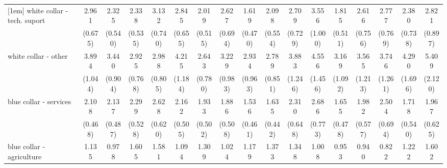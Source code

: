 {\begin{tabular}{l*{16}{c}}
[1em]
white collar - tech. suport&       2.961\sym{***}&       2.325\sym{***}&       2.338\sym{***}&       3.132\sym{***}&       2.845\sym{***}&       2.019\sym{**} &       2.627\sym{***}&       1.619         &       2.098\sym{**} &       2.709\sym{***}&       3.556\sym{***}&       1.815\sym{*}  &       2.616\sym{***}&       2.777\sym{***}&       2.380\sym{**} &       2.821\sym{**} \\
                    &     (0.675)         &     (0.540)         &     (0.535)         &     (0.740)         &     (0.655)         &     (0.515)         &     (0.694)         &     (0.470)         &     (0.554)         &     (0.729)         &     (1.000)         &     (0.511)         &     (0.756)         &     (0.769)         &     (0.738)         &     (0.897)         \\
[1em]
white collar - other&       3.894\sym{***}&       3.440\sym{***}&       2.925\sym{***}&       2.988\sym{***}&       4.215\sym{***}&       2.643\sym{***}&       3.229\sym{***}&       2.934\sym{**} &       2.789\sym{***}&       3.883\sym{***}&       4.556\sym{***}&       3.169\sym{***}&       3.565\sym{***}&       3.746\sym{***}&       4.290\sym{***}&       5.409\sym{***}\\
                    &     (1.044)         &     (0.904)         &     (0.768)         &     (0.805)         &     (1.184)         &     (0.780)         &     (0.983)         &     (0.963)         &     (0.851)         &     (1.246)         &     (1.456)         &     (1.092)         &     (1.213)         &     (1.261)         &     (1.696)         &     (2.120)         \\
[1em]
blue collar - services&       2.108\sym{***}&       2.137\sym{***}&       2.299\sym{***}&       2.628\sym{***}&       2.162\sym{***}&       1.933\sym{*}  &       1.886\sym{*}  &       1.536         &       1.635         &       2.310\sym{**} &       2.686\sym{***}&       1.655         &       1.982\sym{*}  &       2.504\sym{***}&       1.718         &       1.967\sym{*}  \\
                    &     (0.468)         &     (0.487)         &     (0.528)         &     (0.620)         &     (0.505)         &     (0.502)         &     (0.508)         &     (0.461)         &     (0.442)         &     (0.648)         &     (0.773)         &     (0.478)         &     (0.577)         &     (0.694)         &     (0.540)         &     (0.625)         \\
[1em]
blue collar - agriculture&       1.135         &       0.978         &       1.605         &       1.581         &       1.094         &       1.309         &       1.024         &       1.179         &       1.373         &       1.348         &       1.008         &       0.953         &       0.940         &       0.822         &       1.222         &       1.602         \\

\end{tabular}}
